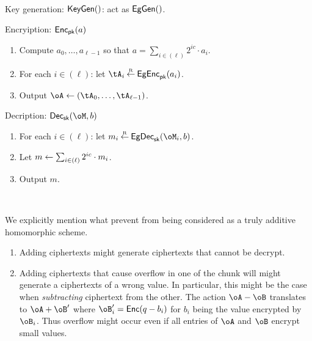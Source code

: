 \begin{algorithm} \label{alg:ChunkEG}~
	
	\item[Key generation:] $\mathsf{KeyGen}()$: act as $\mathsf{EgGen}()$.
	
	\item[Encryiption:] $\mathsf{Enc}_{\mathsf{pk}}(a)$
	
	\begin{enumerate}
		\item Compute $a_0,\ldots,a_{\ell-1}$ so that $a =  \sum_{i \in (\ell)}    2^{i c} \cdot a_i$.
		\item For each $i\in (\ell)$: let $\tA_i \getsr \EgEnc_\pk(a_i)$.
		
		\item Output $\oA \asn (\tA_0,\ldots, \tA_{\ell-1})$.
		
	\end{enumerate}
	 
	\item[Decription:] $\Dec_\sk(\oM,b)$   
	\begin{enumerate}
		\item 	 For each $i\in (\ell)$: let $m_i \getsr \EgDec_\sk(\oM_i,b)$.
		
		\item Let  $m \leftarrow \sum_{i \in (\ell)}   2^{i c} \cdot  m_i $.
		
		\item Output $m$.
	\end{enumerate}
\end{algorithm}


\begin{theorem}\label{thm:ChunkEG}~
\end{theorem}

\begin{remark}\label{rem:ChunkEG}
We explicitly mention what prevent \label{alg:ChunkEG}  from being considered as a truly additive homomorphic scheme.
\begin{enumerate}
	\item Adding ciphertexts might generate ciphertexts that cannot be decrypt.
	
	\item Adding ciphertexts that cause overflow in one of the chunk will might generate  a ciphertexts of a wrong value. In particular, this might be the case when  \emph{subtracting}  ciphertext from the other. The action $\oA - \oB$ translates to $\oA + \oB'$ where $\oB'_i = \Enc(q-b_i)$ for $b_i$ being the value encrypted by  $ \oB_i$. Thus overflow might occur even if  all entries of $\oA $ and $\oB$ encrypt small values. 

\end{enumerate}

\end{remark}


